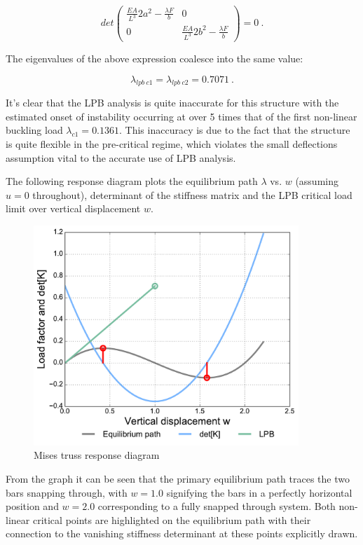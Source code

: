  \begin{equation} 
det
\begin{pmatrix}
\frac{EA}{L^3} 2a^2 - \frac{\lambda F}{b} & 0 \\
0 &  \frac{EA}{L^3} 2b^2 - \frac{\lambda F}{b}
\end{pmatrix}
= 0
\label{eqstab9}\ .
\end{equation}

The eigenvalues of the above expression coalesce into the same value:

\begin{equation} 
\lambda_{lpb\ c1} = 
\lambda_{lpb\ c2} = 0.7071
\label{eqstab10}\ .
\end{equation}

It's clear that the LPB analysis is quite inaccurate for this structure with the estimated onset of instability occurring at over 5 times that of the first non-linear buckling load $\lambda_{c1} = 0.1361$. This inaccuracy is due to the fact that the structure is quite flexible in the pre-critical regime, which violates the small deflections assumption vital to the accurate use of LPB analysis.

The following response diagram plots the equilibrium path $\lambda$ vs. $w$ (assuming $u = 0$ throughout), determinant of the stiffness matrix and the LPB critical load limit over vertical displacement $w$.

\begin{figure}[H]
	\centering
	\def\svgwidth{\columnwidth}
	\includegraphics[width=10cm]{images/stability_analysis_mises_truss_1x1.pdf}
	\caption{Mises truss response diagram}
	\label{stab2}
\end{figure}

From the graph it can be seen that the primary equilibrium path traces the two bars snapping through, with $w=1.0$ signifying the bars in a perfectly horizontal position and $w=2.0$ corresponding to a fully snapped through system. Both non-linear critical points are highlighted on the equilibrium path with their connection to the vanishing stiffness determinant at these points explicitly drawn.

